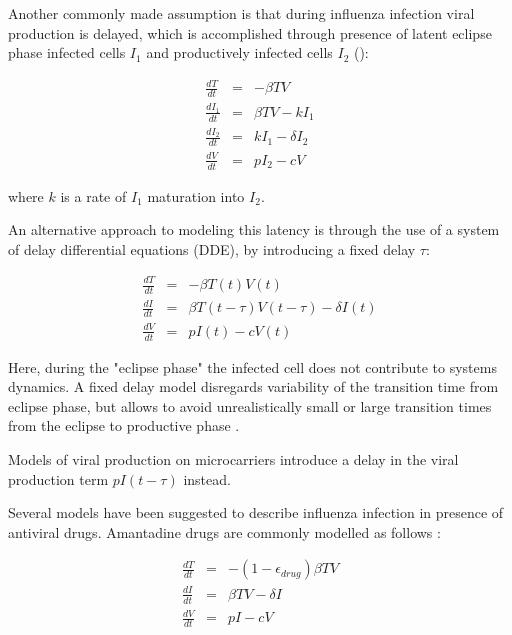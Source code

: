 Another commonly made assumption is that during influenza infection viral production is delayed, which is accomplished through presence of latent eclipse phase infected cells $I_1$ and productively infected cells $I_2$ (\cite{baccam2006kinetics, smith2011effect}):

\begin{equation}
\begin{array}{rcl}
\frac{dT}{dt} &=& - \beta T V \\
\frac{dI_1}{dt} &=& \beta T V - k I_1 \\
\frac{dI_2}{dt} &=& k I_1 - \delta I_2 \\
\frac{dV}{dt} &=& p I_2 - c V
\end{array}
\end{equation}

where $k$ is a rate of $I_1$ maturation into $I_2$.

An alternative approach to modeling this latency is through the use of a system of delay differential equations (DDE), by introducing a fixed delay $\tau$:

\begin{equation}
\begin{array}{rcl}
\frac{dT}{dt} &=& - \beta T(t) V(t) \\
\frac{dI}{dt} &=& \beta T(t-\tau) V(t-\tau) - \delta I(t) \\
\frac{dV}{dt} &=& p I(t) - c V(t)
\end{array}
\end{equation}

Here, during the "eclipse phase" the infected cell does not contribute to systems dynamics. A fixed delay model disregards variability of the transition time from eclipse phase, but allows to avoid unrealistically small or large transition times from the eclipse to productive phase \cite{beauchemin2008modeling}.

Models of viral production on microcarriers \cite{mohler2005mathematical,schulze2009infection} introduce a delay in the viral production term $p I(t - \tau)$ instead.

Several models have been suggested to describe influenza infection in presence of antiviral drugs. Amantadine drugs are commonly modelled as follows \cite{beauchemin2008modeling}:

\begin{equation}
\begin{array}{rcl}
\frac{dT}{dt} &=& - (1-\epsilon_{drug})\beta T V \\
\frac{dI}{dt} &=& \beta T V - \delta I \\
\frac{dV}{dt} &=& p I - c V
\end{array}
\end{equation}

